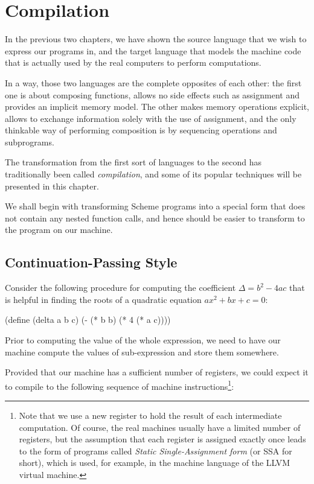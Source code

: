 \chapter{Compilation}

In the previous two chapters, we have shown the source language that we wish
to express our programs in, and the target language that models the machine
code that is actually used by the real computers to perform computations.

In a way, those two languages are the complete opposites of each other:
the first one is about composing functions, allows no side effects such
as assignment and provides an implicit memory model. The other makes
memory operations explicit, allows to exchange information solely with the
use of assignment, and the only thinkable way of performing composition
is by sequencing operations and subprograms.

The transformation from the first sort of languages to the second
has traditionally been called \textit{compilation}, and some of its
popular techniques will be presented in this chapter.

We shall begin with transforming Scheme programs into a special form
that does not contain any nested function calls, and hence should be
easier to transform to the program on our machine.
 
\section{Continuation-Passing Style}

Consider the following procedure for computing the coefficient
$\Delta = b^2 - 4ac$ that is helpful in finding the roots of a quadratic
equation $ax^2+bx+c=0$:

\begin{Snippet}
(define (delta a b c)
  (- (* b b) (* 4 (* a c))))
\end{Snippet}

Prior to computing the value of the whole expression, we need
to have our machine compute the values of sub-expression and
store them somewhere.

Provided that our machine has a sufficient number of registers,
we could expect it to compile to the following sequence of machine
instructions\footnote{Note that we use a new register to hold the
  result of each intermediate computation. Of course, the real machines
  usually have a limited number of registers, but the assumption
  that each register is assigned exactly once leads to the form
  of programs called \textit{Static Single-Assignment form} (or
  SSA for short), which is used, for example, in the machine language
  of the LLVM virtual machine.
}:

